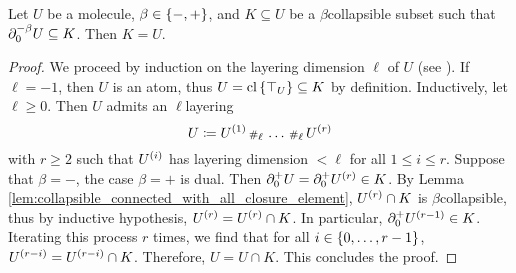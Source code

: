 \begin{lem} \label{lem:collapsible_negbeta_boundary_collapse_all}
    Let \( U \) be a molecule, \( \beta \in \set{-, +} \), and \( K \subseteq U \) be a \( \beta \)\nbd collapsible subset such that \( \bd{0}{-\beta} U \subseteq K \).
    Then \( K = U \).
\end{lem}
\begin{proof}
    We proceed by induction on the layering dimension \( \ell \) of \( U \) (see \cite[Comment 4.2.13]{hadzihasanovic2024combinatorics}).
    If \( \ell = -1 \), then \( U \) is an atom, thus \( U = \clset{\top_U} \subseteq K \) by definition.
    Inductively, let \( \ell \geq 0 \). Then \( U \) admits an \( \ell \)\nbd layering
    \begin{equation*}
        U \eqdef \order{1}{U} \cp{\ell} \ldots \cp{\ell} \order{r}{U}
    \end{equation*}
    with \( r \geq 2 \) such that \( \order{i}{U} \) has layering dimension \( < \ell \) for all \( 1 \le i \le r \).
    Suppose that \( \beta = - \), the case \( \beta = + \) is dual.
    Then \( \bd{0}{+} U = \bd{0}{+} \order{r}{U} \in K \).
    By Lemma \ref{lem:collapsible_connected_with_all_closure_element}, \( \order{r}{U} \cap K \) is \( \beta \)\nbd collapsible, thus by inductive hypothesis, \( \order{r}{U} = \order{r}{U} \cap K \).
    In particular, \( \bd{0}{+} \order{r - 1}{U} \in K \).
    Iterating this process \( r \) times, we find that for all \( i \in \set{0, \ldots, r - 1} \), \( \order{r - i}{U} = \order{r - i}{U} \cap K \).
    Therefore, \( U = U \cap K \).
    This concludes the proof.
\end{proof}

